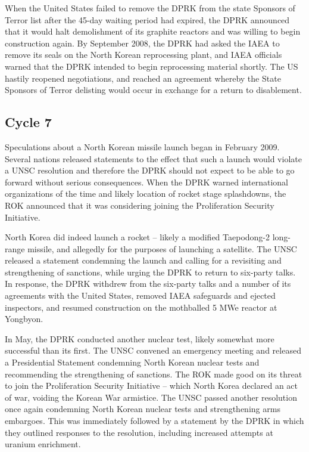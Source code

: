 \documentclass{article}
\begin{document}
When the United States failed to remove the DPRK from the state Sponsors of Terror list after the 45-day waiting period had expired, the DPRK announced that it would halt demolishment of its graphite reactors and was willing to begin construction again\cite{davenport}. By September 2008, the DPRK had asked the IAEA to remove its seals on the North Korean reprocessing plant, and IAEA officials warned that the DPRK intended to begin reprocessing material shortly\cite{iaea09}. The US hastily reopened negotiations, and reached an agreement whereby the State Sponsors of Terror delisting would occur in exchange for a return to disablement\cite{nti15}.

\subsection{Cycle 7}

Speculations about a North Korean missile launch began in February 2009. Several nations released statements to the effect that such a launch would violate a UNSC resolution and therefore the DPRK should not expect to be able to go forward without serious consequences\cite{davenport}. When the DPRK warned international organizations of the time and likely location of rocket stage splashdowns, the ROK announced that it was considering joining the Proliferation Security Initiative\cite{davenport}.

North Korea did indeed launch a rocket – likely a modified Taepodong-2 long-range missile, and allegedly for the purposes of launching a satellite\cite{davenport}. The UNSC released a statement condemning the launch and calling for a revisiting and strengthening of sanctions, while urging the DPRK to return to six-party talks\cite{unsc09}. In response, the DPRK withdrew from the six-party talks and a number of its agreements with the United States\cite{niksch}, removed IAEA safeguards and ejected inspectors\cite{iaea09}, and resumed construction on the mothballed 5 MWe reactor at Yongbyon\cite{nti15}.

In May, the DPRK conducted another nuclear test, likely somewhat more successful than its first\cite{nti15}. The UNSC convened an emergency meeting and released a Presidential Statement condemning North Korean nuclear tests and recommending the strengthening of sanctions\cite{unsc09p}. The ROK made good on its threat to join the Proliferation Security Initiative – which North Korea declared an act of war, voiding the Korean War armistice\cite{glionna}. The UNSC passed another resolution once again condemning North Korean nuclear tests and strengthening arms embargoes\cite{unsc09j}. This was immediately followed by a statement by the DPRK in which they outlined responses to the resolution, including increased attempts at uranium enrichment\cite{nti15}.
\end{document}
